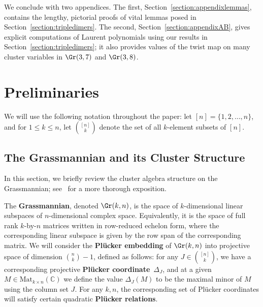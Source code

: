 We conclude with two appendices. The first, Section~\ref{section:appendixlemmas}, contains the lengthy, pictorial proofs of vital lemmas posed in Section~\ref{section:tripledimers}. The second, Section~\ref{section:appendixAB}, gives explicit computations of Laurent polynomials using our results in Section~\ref{section:tripledimers}; it also provides values of the twist map on many cluster variables in $\Gr(3,7)$ and $\Gr(3,8)$.

\section{Preliminaries} \label{section::prelims}
We will use the following notation throughout the paper: let $[n] = \{1,2, \dots, n\}$, and for $1 \leq k \leq n$, let $\binom{[n]}{k}$ denote the set of all $k$-element subsets of $[n]$.

\subsection{The Grassmannian and its Cluster Structure} \label{subsection: clusteralgbackground}
In this section, we briefly review the cluster algebra structure on the Grassmannian; see~\cite{fwz-ch6} for a more thorough exposition.

The \textbf{Grassmannian}, denoted $\Gr(k,n)$, is the space of $k$-dimensional linear subspaces of $n$-dimensional complex space. Equivalently, it is the space of full rank $k$-by-$n$ matrices written in row-reduced echelon form, where the corresponding linear subspace is given by the row span of the corresponding matrix. We will consider the \textbf{Pl\"ucker embedding} of $\Gr(k,n)$ into projective space of dimension $\binom{n}{k}-1$, defined as follows:
for any $J \in \binom{[n]}{k}$, we have a corresponding projective \textbf{Pl\"ucker coordinate}~$\Delta_J$, and at a given $M \in \text{Mat}_{k \times n}(\mathbb{C})$ we define the value $\Delta_J(M)$ to be the maximal minor of $M$ using the column set $J$. For any $k, n$, the corresponding set of Pl\"ucker coordinates will satisfy certain quadratic \textbf{Pl\"ucker relations}.

